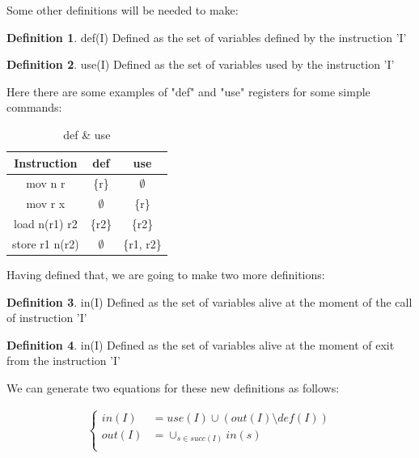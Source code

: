 \documentclass[conference]{IEEEtran}
\theoremstyle{definition}
\newtheorem{definition}{Definition}[section]
\begin{document}
Some other definitions will be needed to make:

\theoremstyle{definition}
\begin{definition}{def(I)}
	Defined as the set of variables defined by the instruction 'I'
\end{definition}
\theoremstyle{definition}
\begin{definition}{use(I)}
	Defined as the set of variables used by the instruction 'I'
\end{definition}

Here there are some examples of "def" and "use" registers for some simple commands:

\begin{table}[H]
	\begin{center}
		\begin{tabular}{||c | c | c||}
			\hline
			Instruction & def & use  \\ [0.5ex]
			\hline\hline
			mov n r & \{r\} &   $\emptyset$ \\
			\hline
			mov r x & $\emptyset$ & \{r\} \\
			\hline
			load n(r1) r2 & \{r2\} & \{r2\} \\
			\hline
			store r1 n(r2) & $\emptyset$ & \{r1, r2\} \\
			\hline
		\end{tabular}
	\end{center}
	\caption{def \& use} \label{tab:def-and-use}
\end{table}

Having defined that, we are going to make two more definitions:

\theoremstyle{definition}
\begin{definition}{in(I)}
	Defined as the set of variables alive at the moment of the call of instruction 'I'
\end{definition}
\theoremstyle{definition}
\begin{definition}{in(I)}
	Defined as the set of variables alive at the moment of exit from the instruction 'I'
\end{definition}

We can generate two equations for these new definitions as follows:

\begin{align*}
	\left\{
	\begin{array}{cl}
		in(I) & = use(I) \cup (out(I) \setminus def(I)) \\
		out(I) & = \cup_{s \in succ(I)}in(s) \\
	\end{array}
	\right.
\end{align*}
\end{document}
